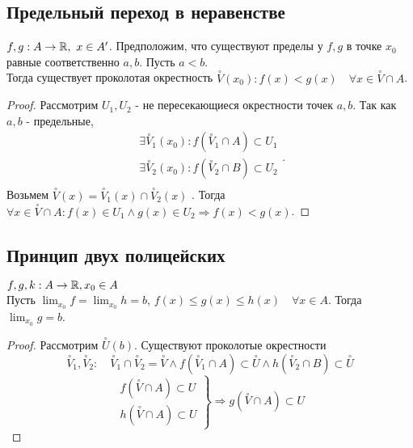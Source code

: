 \documentclass[12pt]{report}
\begin{document}
\subsection{Предельный переход в неравенстве}\label{ques_18}
\begin{thm}
    $f, g :A \to \mathbb{R}, ~x \in A'$. Предположим, что существуют пределы у $f, g$ в точке $x_0$ равные соответственно $a, b$. Пусть $a<b$. \\
    Тогда существует проколотая окрестность  $\stackrel \circ V (x_0): f(x) < g(x) \quad \forall x \in \stackrel \circ V \cap A$.
\end{thm}
\begin{proof}
    Рассмотрим $U_1 , U_2$ - не пересекающиеся окрестности точек $a, b$. Так как $a, b$ - предельные, \[
	\begin{array}{c}
	    \exists \stackrel{\circ} V_1 (x_0): f(\stackrel{\circ} V_1 \cap A) \subset U_1 \\
	    \exists \stackrel{\circ} V_2 (x_0): f(\stackrel{\circ} V_2 \cap B) \subset U_2 \\
    \end{array}
    .\] 
    Возьмем $\stackrel{\circ} V(x) = \stackrel{\circ} V_1(x) \cap \stackrel{\circ} V_2(x)$ . Тогда $\forall x \in \stackrel \circ V \cap A: f(x) \in  U_1 \wedge g(x) \in  U_2 \Rightarrow f(x) < g(x)$.
\end{proof}
\subsection{Принцип двух полицейских}\label{ques_19}
\begin{thm}
     $f, g, k: A \to \mathbb{R}, x_0 \in A$ \\
     Пусть $\lim_{x_0} f = \lim_{x_0} h = b$, $f(x) \le g(x) \le h(x) \quad \forall x \in A$.
     Тогда $\lim_{x_0} g = b$.
\end{thm}
\begin{proof}
    Рассмотрим $\stackrel \circ U(b)$. Существуют проколотые окрестности $$\stackrel \circ V_1, \stackrel \circ V_2:\quad \stackrel \circ V_1 \cap \stackrel \circ V_2  = \stackrel \circ V \wedge 
    f(\stackrel \circ V_1\cap A) \subset \stackrel \circ U \wedge h(\stackrel \circ V_2 \cap B) \subset \stackrel \circ U$$
    $$
    \left . 
    \begin{array}{c}
	f(\stackrel \circ V \cap A) \subset U \\
	h(\stackrel \circ V \cap A) \subset U
    \end{array}
\right \} \Rightarrow g(\stackrel \circ V \cap A) \subset U
    $$
\end{proof}
\end{document}
